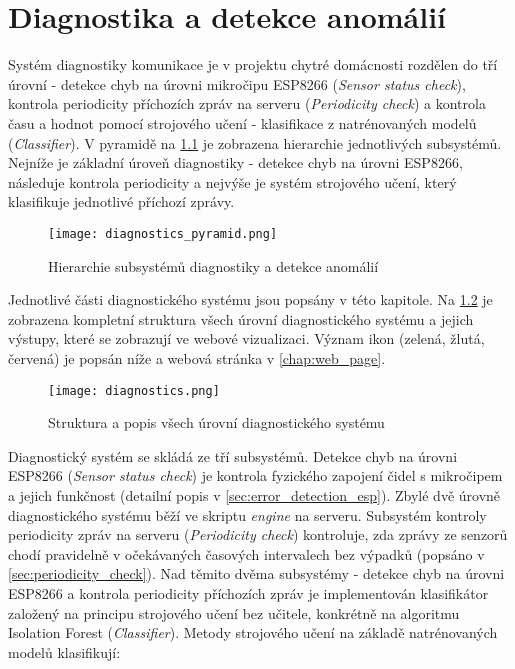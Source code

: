\chapter{Diagnostika a detekce anomálií} \label{chap:diagnostics}
Systém diagnostiky komunikace je v projektu chytré domácnosti rozdělen do tří úrovní - detekce chyb na úrovni mikročipu ESP8266 (\textit{Sensor status check}), kontrola periodicity příchozích zpráv na serveru (\textit{Periodicity check}) a kontrola času a hodnot pomocí strojového učení - klasifikace z natrénovaných modelů (\textit{Classifier}). V pyramidě na \cref{fig:diagnostics_pyramid} je zobrazena hierarchie jednotlivých subsystémů. Nejníže je základní úroveň diagnostiky - detekce chyb na úrovni ESP8266, následuje kontrola periodicity a nejvýše je systém strojového učení, který klasifikuje jednotlivé příchozí zprávy.  

\begin{figure}[H]
  \centering
  \texttt{[image: diagnostics\_pyramid.png]}
  \caption{Hierarchie subsystémů diagnostiky a detekce anomálií}
  \label{fig:diagnostics_pyramid}
\end{figure}  

Jednotlivé části diagnostického systému jsou popsány v této kapitole. Na \cref{fig:diagnostics} je zobrazena kompletní struktura všech úrovní diagnostického systému a jejich výstupy, které se zobrazují ve webové vizualizaci. Význam ikon (zelená, žlutá, červená) je popsán níže a webová stránka v \cref{chap:web_page}. 

\begin{figure}[H]
  \centering
  \texttt{[image: diagnostics.png]}
  \caption{Struktura a popis všech úrovní diagnostického systému}
  \label{fig:diagnostics}
\end{figure}  

Diagnostický systém se skládá ze tří subsystémů. Detekce chyb na úrovni ESP8266 (\textit{Sensor status check}) je kontrola fyzického zapojení čidel s mikročipem a jejich funkčnost (detailní popis v \cref{sec:error_detection_esp}). Zbylé dvě úrovně diagnostického systému běží ve skriptu \textit{engine} na serveru. Subsystém kontroly periodicity zpráv na serveru (\textit{Periodicity check}) kontroluje, zda zprávy ze senzorů chodí pravidelně v očekávaných časových intervalech bez výpadků (popsáno v \cref{sec:periodicity_check}). Nad těmito dvěma subsystémy - detekce chyb na úrovni ESP8266 a kontrola periodicity příchozích zpráv je implementován klasifikátor založený na principu strojového učení bez učitele, konkrétně na algoritmu Isolation Forest (\textit{Classifier}). Metody strojového učení na základě natrénovaných modelů klasifikují:

